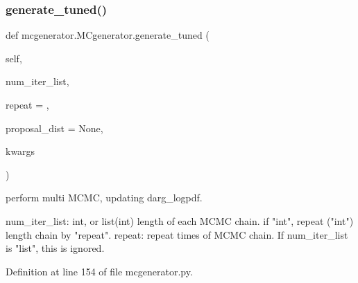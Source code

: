 \subsubsection{\texorpdfstring{generate\+\_\+tuned()}{generate\_tuned()}}
{\footnotesize\ttfamily def mcgenerator.\+M\+Cgenerator.\+generate\+\_\+tuned (\begin{DoxyParamCaption}\item[{}]{self,  }\item[{}]{num\+\_\+iter\+\_\+list,  }\item[{}]{repeat = {},  }\item[{}]{proposal\+\_\+dist = {\ttfamily None},  }\item[{}]{kwargs }\end{DoxyParamCaption})}

\begin{DoxyVerb}perform multi MCMC, updating darg_logpdf.

num_iter_list: int, or list(int)
    length of each MCMC chain. if "int", repeat ("int") length chain by "repeat".
repeat: repeat times of MCMC chain. If num_iter_list is "list", this is ignored.
\end{DoxyVerb}
 

Definition at line 154 of file mcgenerator.\+py.


